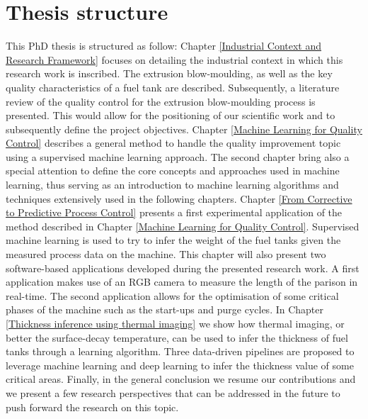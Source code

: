 \section*{Thesis structure}

This PhD thesis is structured as follow: Chapter \ref{Industrial Context and Research Framework} focuses on detailing the industrial context in which this research work is inscribed. The extrusion blow-moulding, as well as the key quality characteristics of a fuel tank are described. Subsequently, a literature review of the quality control for the extrusion blow-moulding process is presented. This would allow for the positioning of our scientific work and to subsequently define the project objectives. Chapter \ref{Machine Learning for Quality Control} describes a general method to handle the quality improvement topic using a supervised machine learning approach. The second chapter bring also a special attention to define the core concepts and approaches used in machine learning, thus serving as an introduction to machine learning algorithms and techniques extensively used in the following chapters. Chapter \ref{From Corrective to Predictive Process Control} presents a first experimental application of the method described in Chapter \ref{Machine Learning for Quality Control}. Supervised machine learning is used  to try to infer the weight of the fuel tanks given the measured process data on the machine. This chapter will also present two software-based applications developed during the presented research work. A first application makes use of an RGB camera to measure the length of the parison in real-time. The second application allows for the optimisation of some critical phases of the machine such as the start-ups and purge cycles. In Chapter \ref{Thickness inference using thermal imaging} we show how thermal imaging, or better the surface-decay temperature, can be used to infer the thickness of fuel tanks through a learning algorithm. Three data-driven pipelines are proposed to leverage machine learning and deep learning to infer the thickness value of some critical areas. Finally, in the general conclusion we resume our contributions and  we present a few research perspectives that can be addressed in the future to push forward the research on this topic.  

\clearpage